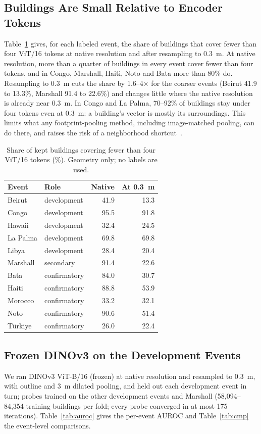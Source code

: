 \documentclass{ieeeaccess}
\begin{document}
\subsection{Buildings Are Small Relative to Encoder Tokens}
\label{sec:res-size}
Table~\ref{tab:tokens} gives, for each labeled event, the share of buildings that cover fewer than four ViT/16 tokens at native resolution and after resampling to 0.3~m. At native resolution, more than a quarter of buildings in every event cover fewer than four tokens, and in Congo, Marshall, Haiti, Noto and Bata more than 80\% do. Resampling to 0.3~m cuts the share by 1.6--4$\times$ for the coarser events (Beirut 41.9 to 13.3\%, Marshall 91.4 to 22.6\%) and changes little where the native resolution is already near 0.3~m. In Congo and La Palma, 70--92\% of buildings stay under four tokens even at 0.3~m: a building's vector is mostly its surroundings. This limits what any footprint-pooling method, including image-matched pooling, can do there, and raises the risk of a neighborhood shortcut~\cite{geirhos2020shortcut}.

\begin{table}[t]
\centering
\caption{Share of kept buildings covering fewer than four ViT/16 tokens (\%). Geometry only; no labels are used.}
\label{tab:tokens}
\footnotesize
\begin{tabular}{@{}llrr@{}}
\toprule
Event & Role & Native & At 0.3~m \\
\midrule
Beirut & development & 41.9 & 13.3 \\
Congo & development & 95.5 & 91.8 \\
Hawaii & development & 32.4 & 24.5 \\
La Palma & development & 69.8 & 69.8 \\
Libya & development & 28.4 & 20.4 \\
Marshall & secondary & 91.4 & 22.6 \\
Bata & confirmatory & 84.0 & 30.7 \\
Haiti & confirmatory & 88.8 & 53.9 \\
Morocco & confirmatory & 33.2 & 32.1 \\
Noto & confirmatory & 90.6 & 51.4 \\
T\"urkiye & confirmatory & 26.0 & 22.4 \\
\bottomrule
\end{tabular}
\end{table}

\subsection{Frozen DINOv3 on the Development Events}
We ran DINOv3 ViT-B/16 (frozen) at native resolution and resampled to 0.3~m, with outline and 3~m dilated pooling, and held out each development event in turn; probes trained on the other development events and Marshall (58,094--84,354 training buildings per fold; every probe converged in at most 175 iterations). Table~\ref{tab:auroc} gives the per-event AUROC and Table~\ref{tab:cmp} the event-level comparisons.
\end{document}
